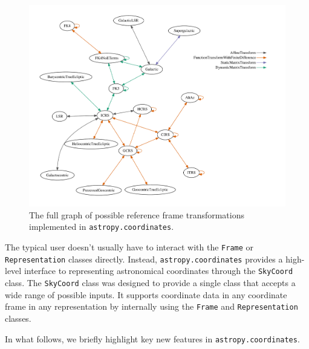 \documentclass[modern]{aastex61}
\begin{document}
\begin{figure}
\includegraphics[width=\textwidth]{coordinates_graph.pdf}
\caption{%
    The full graph of possible reference frame transformations implemented in
    \texttt{astropy.coordinates}.
    \label{fig:frame-transform-graph}
}
\end{figure}

The typical user doesn't usually have to interact with the \texttt{Frame} or
\texttt{Representation} classes directly.
Instead, \texttt{astropy.coordinates} provides a high-level interface to
representing astronomical coordinates through the \texttt{SkyCoord} class.
The \texttt{SkyCoord} class was designed to provide a single class that
accepts a wide range of possible inputs.
It supports coordinate data in any coordinate frame in any representation by
internally using the \texttt{Frame} and \texttt{Representation} classes.

In what follows, we briefly highlight key new features in
\texttt{astropy.coordinates}.
\end{document}
